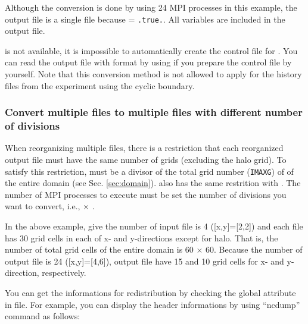 Although the conversion is done by using 24 MPI processes in this example, the output file is a single file because  = \verb|.true.|.
All variables are included in the output file.

 is not available, it is impossible to automatically create the control file for \grads.
You can read the output file with \scalenetcdf format by using \grads if you prepare the control file by yourself.
Note that this conversion method is not allowed to apply for the history files from the experiment using the cyclic boundary.



\subsubsection{Convert multiple \scalenetcdf files to multiple \Netcdf files with different number of divisions}
%

When reorganizing multiple files, there is a restriction that each reorganized output file must have the same number of grids (excluding the halo grid).
To satisfy this restriction,  must be a divisor of the total grid number (\verb|IMAXG|) of {\XDIR} of the entire domain (see Sec. \ref{sec:domain}).  also has the same restrition with .
The number of MPI processes to execute \sno must be set the number of divisions you want to convert, i.e.,  $\times$ .


In the above example, give the number of input file is 4 ([x,y]=[2,2]) and
each file has 30 grid cells in each of x- and y-directions  except for halo.
That is, the number of total grid cells of the entire domain is 60 $\times$ 60.
%
Because the number of output file is 24 ([x,y]=[4,6]),
output file have 15 and 10 grid cells for x- and y- direction, respectively.


You can get the informations for redistribution by checking the global attribute in \scalenetcdf file.
For example, you can display the header informations by using ``ncdump'' command as follows:

